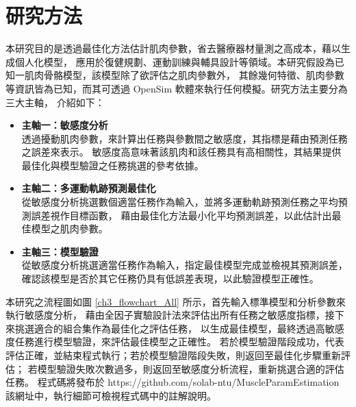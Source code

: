 \chapter{研究方法}
\fontsize{12pt}{18pt}\selectfont

本研究目的是透過最佳化方法估計肌肉參數，省去醫療器材量測之高成本，藉以生成個人化模型，
應用於復健規劃、運動訓練與輔具設計等領域。本研究假設為已知一肌肉骨骼模型，該模型除了欲評估之肌肉參數外，
其餘幾何特徵、肌肉參數等資訊皆為已知，而其可透過 OpenSim 軟體來執行任何模擬。研究方法主要分為三大主軸，
介紹如下：
\begin{itemize}
    \item \textbf{主軸一：敏感度分析}
    \\ 透過擾動肌肉參數，來計算出任務與參數間之敏感度，其指標是藉由預測任務之誤差來表示。
       敏感度高意味著該肌肉和該任務具有高相關性，其結果提供最佳化與模型驗證之任務挑選的參考依據。
    \item \textbf{主軸二：多運動軌跡預測最佳化}
    \\ 從敏感度分析挑選數個適當任務作為輸入，並將多運動軌跡預測任務之平均預測誤差視作目標函數，
       藉由最佳化方法最小化平均預測誤差，以此估計出最佳模型之肌肉參數。   
    \item \textbf{主軸三：模型驗證}
    \\ 從敏感度分析挑選適當任務作為輸入，指定最佳模型完成並檢視其預測誤差，
       確認該模型是否於其它任務仍具有低誤差表現，以此驗證模型正確性。
\end{itemize}

本研究之流程圖如圖 \ref{ch3_flowchart_All} 所示，首先輸入標準模型和分析參數來執行敏感度分析，
藉由全因子實驗設計法來評估出所有任務之敏感度指標，接下來挑選適合的組合集作為最佳化之評估任務，
以生成最佳模型，最終透過高敏感度任務進行模型驗證，來評估最佳模型之正確性。
若於模型驗證階段成功，代表評估正確，並結束程式執行；若於模型驗證階段失敗，則返回至最佳化步驟重新評估；
若模型驗證失敗次數過多，則返回至敏感度分析流程，重新挑選合適的評估任務。
程式碼將發布於 https://github.com/solab-ntu/MuscleParamEstimation 該網址中，執行細節可檢視程式碼中的註解說明。

